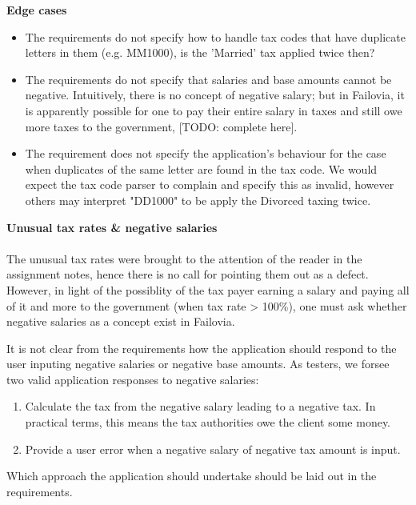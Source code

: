 \textbf{Edge cases}
\begin{itemize}
	\item The requirements do not specify how to handle tax codes that have duplicate letters in them (e.g. MM1000), is the 'Married' tax applied twice then? 
	\item The requirements do not specify that salaries and base amounts cannot be negative. Intuitively, there is no concept of negative salary; but in Failovia, it is apparently possible for one to pay their entire salary in taxes and still owe more taxes to the government, [TODO: complete here]. 
	\item The requirement does not specify the application's behaviour for the case when duplicates of the same letter are found in the tax code. We would expect the tax code parser to complain and specify this as invalid, however others may interpret "DD1000" to be apply the Divorced taxing twice. 
\end{itemize}

\textbf{Unusual tax rates \& negative salaries \\}
\\
The unusual tax rates were brought to the attention of the reader in the assignment notes, hence there is no call for pointing them out as a defect. However, in light of the possiblity of the tax payer earning a salary and paying all of it and more to the government (when tax rate > 100\%), one must ask whether negative salaries as a concept exist in Failovia. 

It is not clear from the requirements how the application should respond to the user inputing negative salaries or negative base amounts. As testers, we forsee two valid application responses to negative salaries: 

\begin{enumerate}
	\item Calculate the tax from the negative salary leading to a negative tax. In practical terms, this means the tax authorities owe the client some money.
	\item Provide a user error when a negative salary of negative tax amount is input. 
\end{enumerate}

Which approach the application should undertake should be laid out in the requirements.

